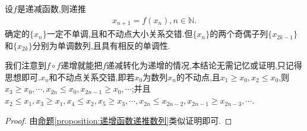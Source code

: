 \documentclass[../../main.tex]{subfiles}%
\begin{document}
\begin{proposition}[递减函数递推数列]\label{proposition:递减函数递推数列}
设\(f\)是递减函数,则递推
\begin{align}\label{equation:486561}
x_{n + 1} = f(x_n),n \in \mathbb{N}.
\end{align}
确定的\(\{x_n\}\)一定不单调,且和不动点大小关系交错.但$\{x_n\}$的两个奇偶子列$\{x_{2k-1}\}$和$\{x_{2k}\}$分别为单调数列,且具有相反的单调性.
\end{proposition}
\begin{note}
我们注意到\(f\circ f\)递增就能把\(f\)递减转化为递增的情况,本结论无需记忆或证明,只记得思想即可.$x_n$和不动点关系交错,即若$x_0$为数列${x_n}$的不动点,且$x_1\geqslant  x_0,x_2\leqslant  x_0$,则$x_3 \geqslant  x_0,\cdots,x_{2n}\leqslant  x_0,x_{2n-1}\geqslant  x_0,\cdots$;并且$x_2\leqslant  x_1,x_3\geqslant  x_1,x_4\leqslant  x_2,x_5\geqslant  x_3,\cdots,x_{2n}\leqslant  x_{2n-2},x_{2n-1}\geqslant  x_{2n-3},\cdots$.
\end{note}
\begin{proof}

由\hyperref[proposition:递增函数递推数列]{命题\ref{proposition:递增函数递推数列}}类似证明即可.

\end{proof}
\end{document}
